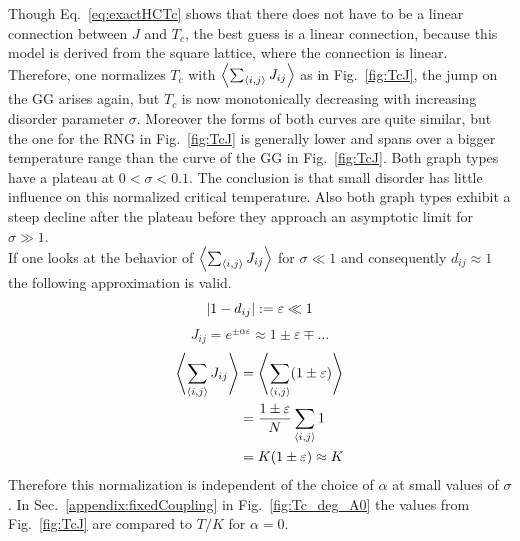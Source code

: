         Though Eq.\ \eqref{eq:exactHCTc} shows that there does not have
        to be a linear connection between \(J\) and \(T_c\), the best guess
        is a linear connection, because this model is derived from the
        square lattice, where the connection is linear. Therefore, one
        normalizes \(T_c\) with \(\left< \sum_{\left< i,j \right>} J_{ij} \right>\) as in
        Fig.\ \ref{fig:TcJ}, the
        jump on the GG arises again, but \(T_c\) is now monotonically
        decreasing with increasing disorder parameter \(\sigma\).
        Moreover the forms of both curves are quite similar, but the
        one for the RNG in Fig.\ \ref{fig:TcJ}
        is generally lower and spans over a bigger temperature range than
        the curve of the GG in Fig.\ \ref{fig:TcJ}.
        Both graph types have a plateau at \(0 < \sigma < 0.1\). The conclusion
        is that small disorder has little influence on this normalized critical
        temperature.
        Also both graph types exhibit a steep decline after the plateau before
        they approach an asymptotic limit for \(\sigma \gg 1\).\\
        If one looks at the behavior of \(\left< \sum_{\left< i,j \right>} J_{ij} \right>\)
        for \(\sigma \ll 1\) and consequently \(d_{ij} \approx 1\) the
        following approximation is valid.
        \begin{equation}
            \left\vert1-d_{ij}\right\vert := \varepsilon \ll 1
        \end{equation}
        \begin{equation}
            J_{ij} = e^{\pm \alpha \varepsilon} \approx 1 \pm \varepsilon \mp \dots
        \end{equation}
        \begin{align}
            \left< \sum_{\left< i,j \right>} J_{ij} \right> &= \left< \sum_{\left< i,j \right>} (1 \pm \varepsilon) \right> \\
                                          &= \frac{1 \pm \varepsilon}{N} \sum_{\left< i,j \right>} 1 \\
                                          &= K(1 \pm \varepsilon) \approx K
        \end{align}
        Therefore this normalization is independent of the choice of \(\alpha\)
        at small values of \(\sigma\). In Sec.\ \ref{appendix:fixedCoupling}
        in Fig.\ \ref{fig:Tc_deg_A0}
        the values from Fig.\ \ref{fig:TcJ}
        are compared to \(T / K\) for \(\alpha = 0\).

